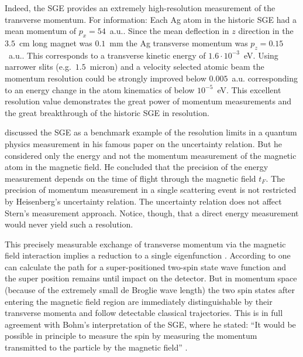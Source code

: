 \documentclass[12pt]{article}
\begin{document}
Indeed, the SGE provides an extremely high-resolution measurement of the transverse momentum.  For information: Each Ag atom in the historic SGE had a mean momentum of $p_x = 54$~a.u.. Since the mean deflection in $z$ direction in the $3.5$~cm long magnet was $0.1$~mm the Ag transverse momentum was $p_z = 0.15$~a.u.. This corresponds to a transverse kinetic energy of $1.6\cdot10^{-3}$~eV. Using narrower slits (e.g.\ $1.5$~micron) and a velocity selected atomic beam the momentum resolution could be strongly improved below $0.005$~a.u. corresponding to an energy change in the atom kinematics of below $10^{-5}$~eV. This excellent resolution value demonstrates the great power of momentum measurements and the great breakthrough of the historic SGE in resolution. 

\cite{HeisenbergW1927Inhalt} discussed the SGE as a benchmark example of the resolution limits in a quantum physics measurement in his famous paper on the uncertainty relation. But he considered only the energy and not the momentum measurement of the magnetic atom in the magnetic field. He concluded that the precision of the energy measurement depends on the time of flight through the magnetic field $t_F$. The precision of momentum measurement in a single scattering event is not restricted by Heisenberg's uncertainty relation.  The uncertainty relation does not affect Stern's measurement approach. Notice, though, that a direct energy measurement would never yield such a resolution.

This precisely measurable exchange of transverse momentum via the magnetic field interaction implies a reduction to a single eigenfunction \citep{DevereuxM2015Reduction}. According to \cite[ch.~21]{BohmD1951Quantum} one can calculate the path for a super-positioned two-spin state wave function and the super position remains until impact on the detector. But in momentum space (because of the extremely small de Broglie wave length) the two spin states after entering the magnetic field region are immediately distinguishable by their transverse momenta and follow detectable classical trajectories. 
This is in full agreement with Bohm's interpretation of the SGE, where he stated: ``It would be possible in principle to measure the spin by measuring the momentum transmitted to the particle by the magnetic field'' \cite[p.~596]{BohmD1951Quantum}.
\end{document}
